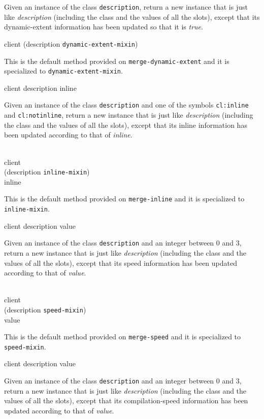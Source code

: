 Given an instance of the class \texttt{description}, return a
new instance that is just like \textit{description}
(including the class and the values of all the slots), except that its
dynamic-extent information has been updated so that it is \emph{true}.

{\footnotesize
{} {client (description {\tt dynamic-extent-mixin})}
}

This is the default method provided on
\texttt{merge-dynamic-extent} and it is specialized to
\texttt{dynamic-extent-mixin}.

 {client description inline}

Given an instance of the class \texttt{description} and one
of the symbols \texttt{cl:inline} and \texttt{cl:notinline},
return a new instance that is just like
\textit{description} (including the class and the values of
all the slots), except that its inline information has been updated
according to that of \textit{inline}.

\\
           {client\\
            (description {\tt inline-mixin})\\
            inline}

This is the default method provided on \texttt{merge-inline}
and it is specialized to \texttt{inline-mixin}.

 {client description value}

Given an instance of the class \texttt{description} and an
integer between $0$ and $3$, return a new instance that is just like
\textit{description} (including the class and the values of
all the slots), except that its speed information has been updated
according to that of \textit{value}.

\\
           {client\\
            (description {\tt speed-mixin})\\
            value}

This is the default method provided on \texttt{merge-speed} and it is
specialized to \texttt{speed-mixin}.

 {client description value}

Given an instance of the class \texttt{description} and an
integer between $0$ and $3$, return a new instance that is just like
\textit{description} (including the class and the values of
all the slots), except that its compilation-speed information has been
updated according to that of \textit{value}.

